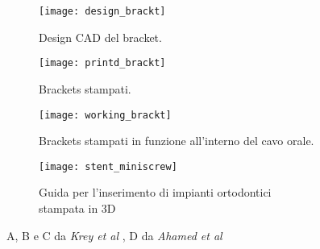 \begin{figure}[h!]
 
\begin{subfigure}{0.5\textwidth}
\centering
\texttt{[image: design\_brackt]} 
\caption{Design CAD del bracket.}
\label{fig:design_brackt}
\end{subfigure}
\begin{subfigure}{0.5\textwidth}
\centering
\texttt{[image: printd\_brackt]}
\caption{Brackets stampati.}
\label{fig:printd_brackt}
\end{subfigure}
\begin{subfigure}{0.5\textwidth}
\centering
\texttt{[image: working\_brackt]}
\caption{Brackets stampati in funzione all'interno del cavo orale.}
\label{fig:working_brackt}
\end{subfigure}
\begin{subfigure}{0.5\textwidth}
\centering
\texttt{[image: stent\_miniscrew]}
\caption{Guida per l'inserimento di impianti ortodontici stampata in 3D}
\label{fig:stent_miniscrew}
\end{subfigure}
\caption{A, B e C da \emph{Krey et al} \parencite{Reference115}, D da \emph{Ahamed et al} \parencite{Reference116}}
\label{fig:3d_ortho}
\end{figure}


